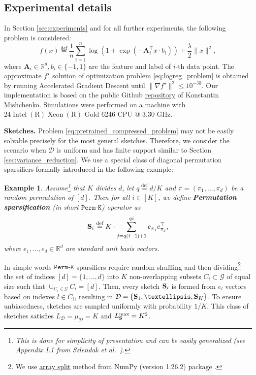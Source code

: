 \documentclass{article}
\newcommand{\bb}{\mathbb}
\newcommand{\R}{\bb R}
\newcommand{\cD}{\mathcal{D}}
\newcommand{\eqdef}{\stackrel{\text{def}}{=}}
\newtheorem{example}{Example}
\theoremstyle{plain}
\newcommand{\mS}{{\bf S}}
\theoremstyle{plain}
\theoremstyle{definition}
\theoremstyle{remark}
\begin{document}
\subsection{Experimental details}
In Section \ref{sec:experiments} and for all further experiments, the following problem is considered:
\begin{equation} \label{eq:logreg_problem}
    f(x) \eqdef
    \frac{1}{n} \sum_{i=1}^{n} \log \left(1+\exp (-\mathbf{A}_{i}^{\top} x \cdot b_{i})\right) + \frac{\lambda}{2}\|x\|^{2},
\end{equation}
where $\mathbf{A}_{i} \in \mathbb{R}^{d}, b_{i} \in\{-1,1\}$ are the feature and label of $i$-th data point.
The approximate  $f^\star$ solution of optimization problem \eqref{eq:logreg_problem} is obtained by running Accelerated Gradient Descent \citep{nesterov1983method} until $\|\nabla f^\star\|^2 \leq 10^{-30}$. Our implementation is based on the public Github \href{https://github.com/konstmish/opt_methods}{repository} of Konstantin Mishchenko. Simulations were performed on a machine with $24 \operatorname{Intel}(\mathrm{R}) \operatorname{Xeon}(\mathrm{R})$ Gold 6246 $\mathrm{CPU}$ @ 3.30 $\mathrm{GHz}$.

\textbf{Sketches.} Problem \eqref{eq:pretrained_compressed_problem} may not be easily solvable precisely for the most general sketches. Therefore, we consider the scenario when $\cD$ is uniform and has finite support similar to Section \ref{sec:variance_reduction}. We use a special class of diagonal permutation sparsifiers formally introduced in the following example:
\begin{example}
Assume\footnote{This is done for simplicity of presentation and can be easily generalized (see Appendix I.1 from Szlendak et al.~\citep{szlendak2022permutation}).} that $K$ divides $d$, let $q \eqdef d/K $ and $\pi=(\pi_1, \ldots, \pi_d)$ be a random permutation of $[d]$. Then for all $i \in [K]$, we define \textbf{Permutation sparsification} (in short $\texttt{Perm-K}$) operator as
\begin{equation} \label{eq:perm_sketch}
    \mS_i \eqdef K \cdot \sum \limits_{j=q(i-1)+1}^{q i} e_{\pi_j} e_{\pi_j}^\top,
\end{equation}
where $e_1, \dots, e_d \in \R^d$ are standard unit basis vectors.
\end{example}
In simple words $\texttt{Perm-K}$ sparsifiers require random shuffling and then dividing\footnote{We use \href{https://numpy.org/doc/stable/reference/generated/numpy.array_split.html}{array\underline{{ }{ }}split} method from NumPy (version 1.26.2) package \citep{harris2020array}.} the set of indices $[d] = \{1, \dots, d\}$ into $K$ non-overlapping subsets $C_i \subset \mathcal{G}$ of equal size such that $\cup_{C_i \in \mathcal{G}} C_i = [d]$. Then, every sketch $\mS_i$ is formed from $e_l$ vectors based on indexes $l \in C_i$, resulting in $\cD = \{\mS_1, \dots, \mS_K\}$. To ensure unbiasedness, sketches are sampled uniformly with probability $1/K$.
This class of sketches satisfies $L_\cD = \mu_\cD = K$ and $L_\mS^{\max} = K^2$.
\end{document}
